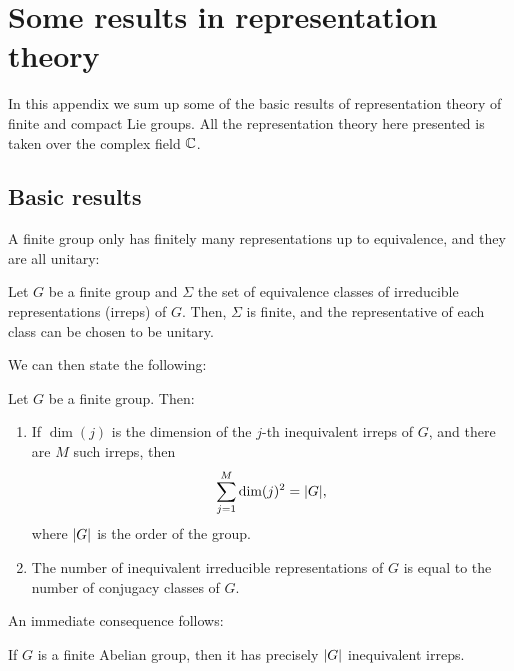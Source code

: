 \chapter{Some results in representation theory}
\label{app:some_results_in_representation_theory}

In this appendix we sum up some of the basic results of representation theory of finite and compact Lie groups.
All the representation theory here presented is taken over the complex field $\mathbb{C}$.

\section{Basic results}
\label{sec:basic_results}

A finite group only has finitely many representations up to equivalence, and they are all unitary:

\begin{theorem}
    Let $G$ be a finite group and $\Sigma$ the set of equivalence classes of irreducible representations (irreps) of $G$.
    Then, $\Sigma$ is finite, and the representative of each class can be chosen to be unitary.
\end{theorem}

We can then state the following:

\begin{theorem}[Burnside]
    Let $G$ be a finite group.
    Then:
    \begin{enumerate}
        \item If $\dim(j) $ is the dimension of the $j$-th inequivalent irreps of $G$, and there are $M$ such irreps, then
            \begin{equation*}
                \sum_{j = 1}^{M} \text{\normalfont dim}(j)^2 = \abs{G},
            \end{equation*}
        where $\abs{G}$ is the order of the group.

        \item The number of inequivalent irreducible representations of $G$ is equal to the number of conjugacy classes of $G$.
    \end{enumerate}
\end{theorem}

An immediate consequence follows:

\begin{corollary}
    If $G$ is a finite Abelian group, then it has precisely $\abs{G}$  inequivalent irreps.
\end{corollary}


